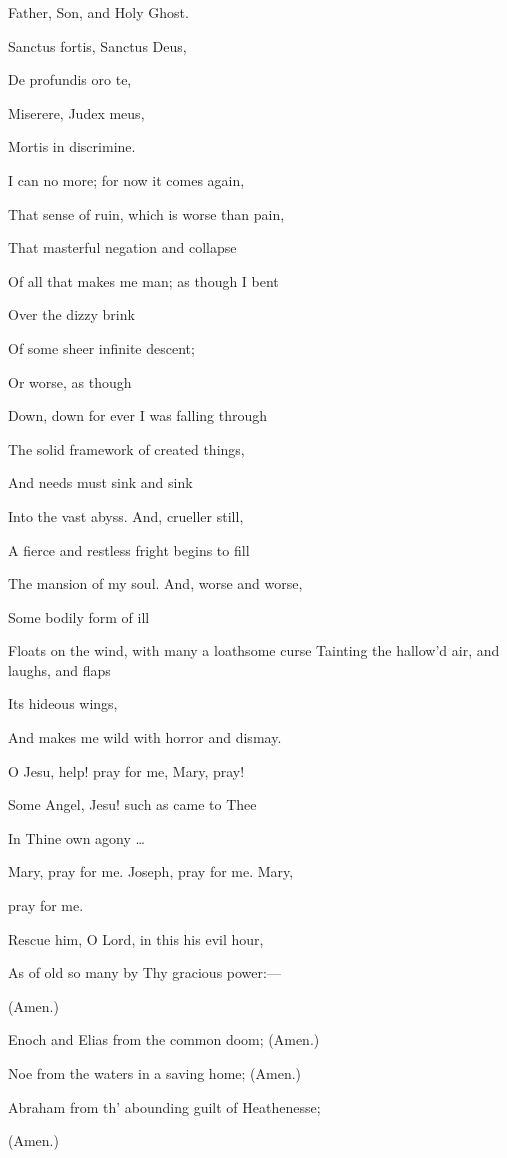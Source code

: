 Father, Son, and Holy Ghost.

Sanctus fortis, Sanctus Deus,

De profundis oro te,

Miserere, Judex meus,

Mortis in discrimine.

I can no more; for now it comes again,

That sense of ruin, which is worse than pain,

That masterful negation and collapse

Of all that makes me man; as though I bent

Over the dizzy brink

Of some sheer infinite descent;

Or worse, as though

Down, down for ever I was falling through

The solid framework of created things,

And needs must sink and sink

Into the vast abyss. And, crueller still,

A fierce and restless fright begins to fill

The mansion of my soul. And, worse and worse,

Some bodily form of ill

Floats on the wind, with many a loathsome curse Tainting the hallow'd air, and laughs, and flaps

Its hideous wings,

And makes me wild with horror and dismay.

O Jesu, help! pray for me, Mary, pray!

Some Angel, Jesu! such as came to Thee

In Thine own agony …

Mary, pray for me. Joseph, pray for me. Mary,

pray for me.


Rescue him, O Lord, in this his evil hour,

As of old so many by Thy gracious power:—

(Amen.)

Enoch and Elias from the common doom; (Amen.)

Noe from the waters in a saving home; (Amen.)

Abraham from th' abounding guilt of Heathenesse;

(Amen.)

